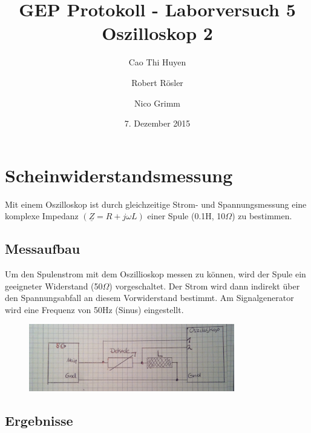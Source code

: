 \documentclass[11pt,a4paper,titlepage]{article}
\begin{document}
\title{GEP Protokoll - Laborversuch 5\\
Oszilloskop 2}
\author{Cao Thi Huyen \and Robert R\"osler \and Nico Grimm}
\date{7. Dezember 2015}
\maketitle
\section{Scheinwiderstandsmessung}
Mit einem Oszilloskop ist durch gleichzeitige Strom- und Spannungsmessung eine komplexe Impedanz \((\underline{Z}=R+j\omega L)\) einer Spule (0.1H, 10$\Omega$) zu bestimmen.
\subsection{Messaufbau}
Um den Spulenstrom mit dem Oszillioskop messen zu k\"onnen, wird der Spule ein geeigneter Widerstand (50$\Omega$) vorgeschaltet. Der Strom wird dann indirekt \"uber den Spannungsabfall an diesem Vorwiderstand bestimmt. Am Signalgenerator wird eine Frequenz von 50Hz (Sinus) eingestellt.
\begin{figure}[h!]\label{fig:schaltung}
\begin{center}
\includegraphics[width=0.8\textwidth]{schaltplan}
\end{center}
\end{figure}
\subsection{Ergebnisse}
\end{document}

